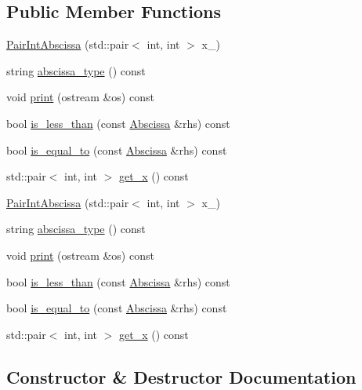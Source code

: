 \subsection*{Public Member Functions}
\begin{DoxyCompactItemize}
\item 
\mbox{\hyperlink{classPairIntAbscissa_ad3882c6aa7d5b525db54c0f1859c0cd6}{Pair\+Int\+Abscissa}} (std\+::pair$<$ int, int $>$ x\+\_\+)
\item 
string \mbox{\hyperlink{classPairIntAbscissa_a7b186cfb2c2d44289b12f0ade56ea948}{abscissa\+\_\+type}} () const
\item 
void \mbox{\hyperlink{classPairIntAbscissa_aab7471f83b36cb5a16212902a30d8ce2}{print}} (ostream \&os) const
\item 
bool \mbox{\hyperlink{classPairIntAbscissa_ab14bfd8eb2b117045417496b68a77c30}{is\+\_\+less\+\_\+than}} (const \mbox{\hyperlink{classAbscissa}{Abscissa}} \&rhs) const
\item 
bool \mbox{\hyperlink{classPairIntAbscissa_a9f4bf45aafd0efa0a47fa6e8b77e25fa}{is\+\_\+equal\+\_\+to}} (const \mbox{\hyperlink{classAbscissa}{Abscissa}} \&rhs) const
\item 
std\+::pair$<$ int, int $>$ \mbox{\hyperlink{classPairIntAbscissa_ae07a07c11afd74fd1a2e4c5ca9178229}{get\+\_\+x}} () const
\item 
\mbox{\hyperlink{classPairIntAbscissa_ad3882c6aa7d5b525db54c0f1859c0cd6}{Pair\+Int\+Abscissa}} (std\+::pair$<$ int, int $>$ x\+\_\+)
\item 
string \mbox{\hyperlink{classPairIntAbscissa_a7b186cfb2c2d44289b12f0ade56ea948}{abscissa\+\_\+type}} () const
\item 
void \mbox{\hyperlink{classPairIntAbscissa_aab7471f83b36cb5a16212902a30d8ce2}{print}} (ostream \&os) const
\item 
bool \mbox{\hyperlink{classPairIntAbscissa_ab14bfd8eb2b117045417496b68a77c30}{is\+\_\+less\+\_\+than}} (const \mbox{\hyperlink{classAbscissa}{Abscissa}} \&rhs) const
\item 
bool \mbox{\hyperlink{classPairIntAbscissa_a9f4bf45aafd0efa0a47fa6e8b77e25fa}{is\+\_\+equal\+\_\+to}} (const \mbox{\hyperlink{classAbscissa}{Abscissa}} \&rhs) const
\item 
std\+::pair$<$ int, int $>$ \mbox{\hyperlink{classPairIntAbscissa_ae07a07c11afd74fd1a2e4c5ca9178229}{get\+\_\+x}} () const
\end{DoxyCompactItemize}


\subsection{Constructor \& Destructor Documentation}
\mbox{\label{classPairIntAbscissa_ad3882c6aa7d5b525db54c0f1859c0cd6}} 
